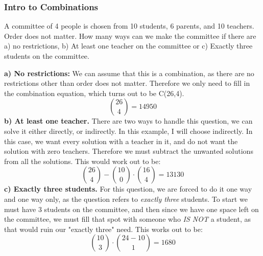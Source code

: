     \clearpage
    
        \subsubsection{Intro to Combinations}
            
            \begin{example}
                A committee of 4 people is chosen from 10 students, 6 parents, and 10 teachers. Order does not matter. How many ways can we make the committee if there are a) no restrictions, b) At least one teacher on the committee or c) Exactly three students on the committee.
            \end{example}
                \textbf{a) No restrictions:}
                 We can assume that this is a combination, as there are no restrictions other than order does not matter. Therefore we only need to fill in the combination equation, which turns out to be C(26,4). 
                 $$\binom{26}{4} = 14950$$
                 \textbf{b) At least one teacher.}
                 There are two ways to handle this question, we can solve it either directly, or indirectly. In this example, I will choose indirectly. In this case, we want every solution with a teacher in it, and do not want the solution with zero teachers. Therefore we must subtract the unwanted solutions from all the solutions. This would work out to be:
                 $$\binom{26}{4} - \binom{10}{0}\cdot\binom{16}{4} = 13130$$
                 \textbf{c) Exactly three students.}
                 For this question, we are forced to do it one way and one way only, as the question refers to \emph{exactly three} students. To start we must have 3 students on the committee, and then since we have one space left on the committee, we must fill that spot with someone who \emph{IS NOT} a student, as that would ruin our "exactly three" need. This works out to be:
                 $$\binom{10}{3}\cdot\binom{24-10}{1} = 1680$$
        